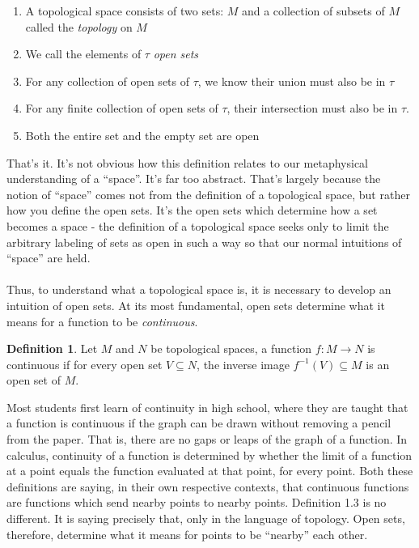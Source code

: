 \documentclass[]{article}
\newcommand\<{\ensuremath{\left\langle}}
\renewcommand\>{\ensuremath{\right\rangle}}
\theoremstyle{definition}
\newtheorem{definition}{Definition}[section]
\theoremstyle{definition}
\begin{document}
	\begin{enumerate}[1.]
		\item A topological space consists of two sets: $M$ and a collection of subsets of $M$ called the \textit{topology} on $M$
		\item We call the elements of $\tau$ \textit{open sets}
		\item For any collection of open sets of $\tau$, we know their union must also be in $\tau$
		\item For any finite collection of open sets of $\tau$, their intersection must also be in $\tau$.
		\item Both the entire set and the empty set are open
	\end{enumerate}
	That's it. It's not obvious how this definition relates to our metaphysical understanding of a ``space''. It's far too abstract. That's largely because the notion of ``space'' comes not from the definition of a topological space, but rather how you define the open sets. It's the open sets which determine how a set becomes a space - the definition of a topological space seeks only to limit the arbitrary labeling of sets as open in such a way so that our normal intuitions of ``space'' are held.\\
	\\
	Thus, to understand what a topological space is, it is necessary to develop an intuition of open sets. At its most fundamental, open sets determine what it means for a function to be \textit{continuous}.
	\begin{definition}
		Let $M$ and $N$ be topological spaces, a function $f : M \to N$ is continuous if for every open set $V \subseteq N$, the inverse image $f^{-1}(V) \subseteq M$ is an open set of $M$. \cite{Munkres2000}
	\end{definition} 
	Most students first learn of continuity in high school, where they are taught that a function is continuous if the graph can be drawn without removing a pencil from the paper. That is, there are no gaps or leaps of the graph of a function. In calculus, continuity of a function is determined by whether the limit of a function at a point equals the function evaluated at that point, for every point. Both these definitions are saying, in their own respective contexts, that continuous functions are functions which send nearby points to nearby points. Definition 1.3 is no different. It is saying precisely that, only in the language of topology. Open sets, therefore, determine what it means for points to be ``nearby'' each other.\\
\end{document}
